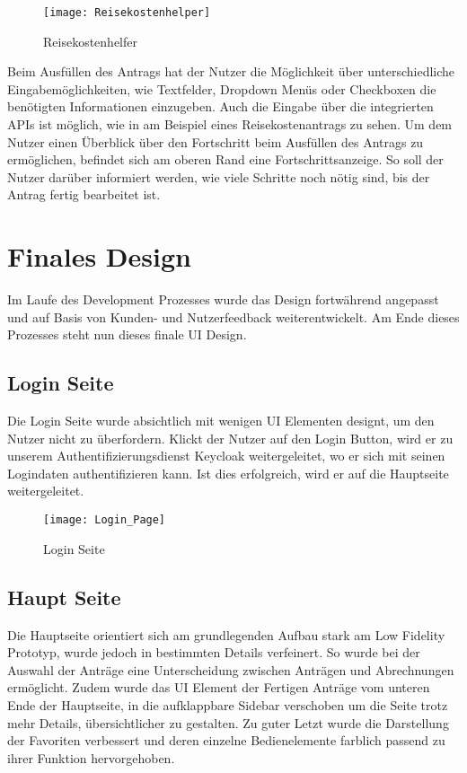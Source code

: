 \begin{figure}[h]
\centering
\texttt{[image: Reisekostenhelper]}
\caption{Reisekostenhelfer}\label{Reisekostenhelfer}
\end{figure}

Beim Ausfüllen des Antrags hat der Nutzer die Möglichkeit über unterschiedliche Eingabemöglichkeiten,
wie Textfelder, Dropdown Menüs oder Checkboxen die benötigten Informationen einzugeben. Auch die Eingabe
über die integrierten \ac{API}s ist möglich, wie in  am Beispiel eines Reisekostenantrags zu sehen.
Um dem Nutzer einen Überblick über den Fortschritt beim Ausfüllen des Antrags zu ermöglichen, befindet sich am oberen
Rand eine Fortschrittsanzeige.
So soll der Nutzer darüber informiert werden, wie viele Schritte noch
nötig sind, bis der Antrag fertig bearbeitet ist.

\section{Finales Design}\label{Finales Design}
Im Laufe des Development Prozesses wurde das Design fortwährend angepasst und auf Basis
von Kunden- und Nutzerfeedback weiterentwickelt. Am Ende dieses Prozesses steht nun
dieses finale \ac{UI} Design.

\subsection{Login Seite}\label{Login Seite}
Die Login Seite wurde absichtlich mit wenigen \ac{UI} Elementen designt, um den Nutzer
nicht zu überfordern. Klickt der Nutzer auf den Login Button, wird er zu unserem
Authentifizierungsdienst Keycloak weitergeleitet, wo er sich mit seinen Logindaten
authentifizieren kann. Ist dies erfolgreich, wird er auf die Hauptseite weitergeleitet.

\begin{figure}[h]
\centering
\texttt{[image: Login\_Page]}
\caption{Login Seite}\label{Login Page}
\end{figure}

\subsection{Haupt Seite}\label{Haupt Seite}
Die Hauptseite orientiert sich am grundlegenden Aufbau stark am Low Fidelity Prototyp,
wurde jedoch in bestimmten Details verfeinert. So wurde bei der Auswahl der Anträge eine
Unterscheidung zwischen Anträgen und Abrechnungen ermöglicht. Zudem wurde das \ac{UI}
Element der Fertigen Anträge vom unteren Ende der Hauptseite, in die aufklappbare Sidebar
verschoben um die Seite trotz mehr Details, übersichtlicher zu gestalten. Zu guter Letzt
wurde die Darstellung der Favoriten verbessert und deren einzelne Bedienelemente farblich
passend zu ihrer Funktion hervorgehoben.

